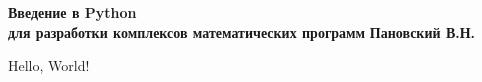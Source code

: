 \documentclass[10pt]{book}
\begin{document}
\begin{titlepage}
\begin{center}
\begin{spacing}{2.5}
{\huge\bfseries Введение в Python \\ для разработки комплексов математических программ}
{\Large\bfseries Пановский В.Н.}\\[5pt]
\end{spacing}
\end{center}
\end{titlepage}

Hello, World!

% 
% 
% 
% 
% 
% 
\end{document}
